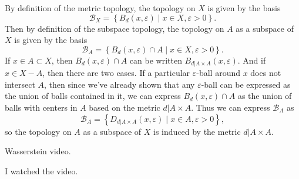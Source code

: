 \documentclass[10pt]{report}
\begin{document}
By definition of the metric topology, the topology on $X$ is given by the basis
\[
\mathcal{B}_{X}= \left\{B_{d}(x,\varepsilon) \;|\; x \in X, \varepsilon>0\right\}.
\] Then by definition of the subspace topology, the topology on $A$ as a subspace of $X$ is given by the basis
\[
	\mathcal{B}_{A} = \left\{ B_{d}(x,\varepsilon) \cap A \;|\; x \in X, \varepsilon>0 \right\}.
\] If $x \in A \subset X$, then $B_{d}(x,\varepsilon) \cap A$ can be written $B_{d|A \times A}(x,\varepsilon).$ And if $x \in X-A$, then there are two cases. If a particular $\varepsilon$-ball around $x$ does not intersect $A$, then since we've already shown that any $\varepsilon$-ball can be expressed as the union of balls contained in it, we can express $B_{d}(x,\varepsilon) \cap A$ as the union of balls with centers in $A$ based on the metric $d|A \times A$. Thus we can express $\mathcal{B}_{A}$ as
\[
	\mathcal{B}_{A} = \left\{ D_{d|A \times A}(x,\varepsilon) \;|\; x \in A, \varepsilon>0 \right\},
\] so the topology on $A$ as a subspace of $X$ is induced by the metric $d|A \times A$.

\begin{exer}[]
Wasserstein video.
\end{exer}
I watched the video.
\end{document}
